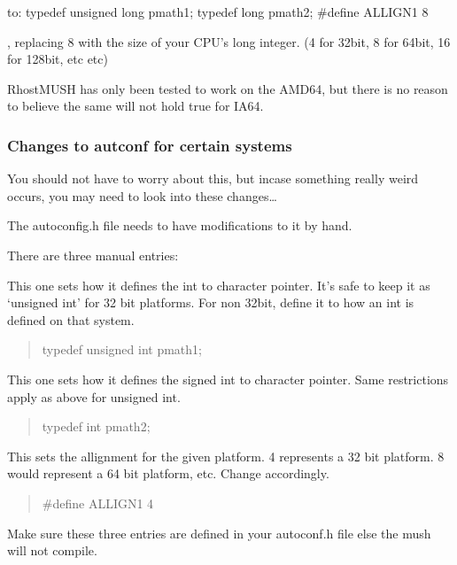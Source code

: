 \documentclass[letterpaper,10pt,english]{sphinxmanual}
\begin{document}
\sphinxAtStartPar
to:
typedef unsigned long   pmath1;
typedef long            pmath2;
\#define ALLIGN1 8

\sphinxAtStartPar
, replacing 8 with the size of your CPU’s long integer. (4 for 32\sphinxhyphen{}bit,
8 for 64\sphinxhyphen{}bit, 16 for 128\sphinxhyphen{}bit, etc etc)

\sphinxAtStartPar
RhostMUSH has only been tested to work on the AMD64, but there is no
reason to believe the same will not hold true for IA64.


\subsubsection{Changes to autconf for certain systems}
\label{\detokenize{troubleshooting:changes-to-autconf-for-certain-systems}}
\sphinxAtStartPar
You should not have to worry about this, but incase something really
weird occurs, you may need to look into these changes…

\sphinxAtStartPar
The autoconfig.h file needs to have modifications to it by hand.

\sphinxAtStartPar
There are three manual entries:

\sphinxAtStartPar
This one sets how it defines the int to character pointer.  It’s safe
to keep it as ‘unsigned int’ for 32 bit platforms.  For non 32\sphinxhyphen{}bit,
define it to  how an int is defined on that system.
\begin{quote}

\sphinxAtStartPar
typedef unsigned int    pmath1;
\end{quote}

\sphinxAtStartPar
This one sets how it defines the signed int to character pointer.  Same
restrictions apply as above for unsigned int.
\begin{quote}

\sphinxAtStartPar
typedef int     pmath2;
\end{quote}

\sphinxAtStartPar
This sets the allignment for the given platform.  4 represents a 32 bit
platform.  8 would represent a 64 bit platform, etc.  Change accordingly.
\begin{quote}

\sphinxAtStartPar
\#define ALLIGN1 4
\end{quote}

\sphinxAtStartPar
Make sure these three entries are defined in your autoconf.h file else
the mush will not compile.
\end{document}
